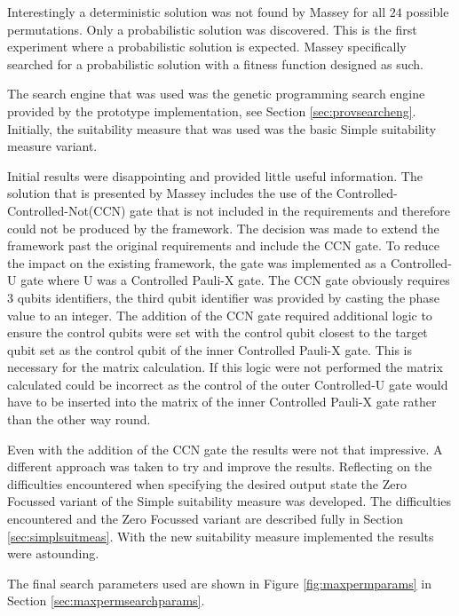 Interestingly a deterministic solution was not found by Massey for all $24$ possible permutations.
Only a probabilistic solution was discovered.
This is the first experiment where a probabilistic solution is expected.
Massey specifically searched for a probabilistic solution with a fitness function designed as such.

The search engine that was used was the genetic programming search engine provided by the prototype implementation, see Section \ref{sec:provsearcheng}.
Initially, the suitability measure that was used was the basic Simple suitability measure variant.

Initial results were disappointing and provided little useful information.
The solution that is presented by Massey includes the use of the Controlled-Controlled-Not(CCN) gate that is not included in the requirements and therefore could not be produced by the framework.
The decision was made to extend the framework past the original requirements and include the CCN gate.
To reduce the impact on the existing framework, the gate was implemented as a Controlled-U gate where U was a Controlled Pauli-X gate.
The CCN gate obviously requires 3 qubits identifiers, the third qubit identifier was provided by casting the phase value to an integer.
The addition of the CCN gate required additional logic to ensure the control qubits were set with the control qubit closest to the target qubit set as the control qubit of the inner Controlled Pauli-X gate.
This is necessary for the matrix calculation.
If this logic were not performed the matrix calculated could be incorrect as the control of the outer Controlled-U gate would have to be inserted into the matrix of the inner Controlled Pauli-X gate rather than the other way round.

Even with the addition of the CCN gate the results were not that impressive.
A different approach was taken to try and improve the results.
Reflecting on the difficulties encountered when specifying the desired output state the Zero Focussed variant of the Simple suitability measure was developed.
The difficulties encountered and the Zero Focussed variant are described fully in Section \ref{sec:simplsuitmeas}.
With the new suitability measure implemented the results were astounding.


The final search parameters used are shown in Figure \ref{fig:maxpermparams} in Section \ref{sec:maxpermsearchparams}.

